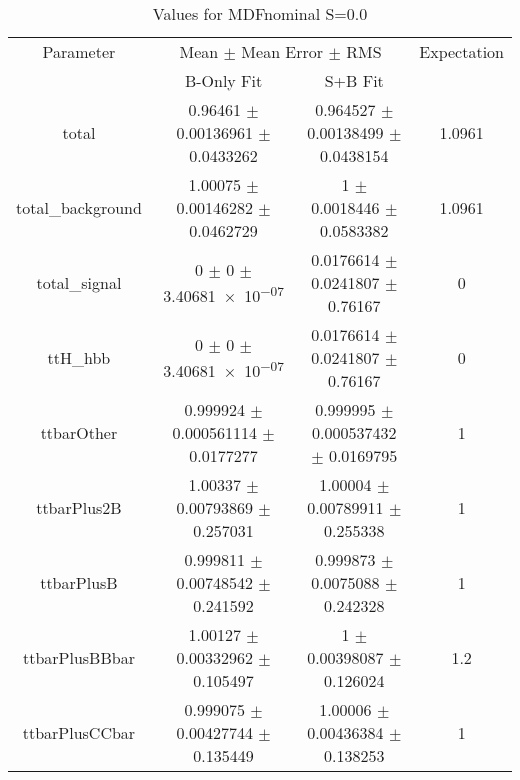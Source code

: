 \begin{table}
\centering
\caption{Values for MDFnominal S=0.0}
\begin{tabular}{cccc}
\toprule
Parameter & \multicolumn{2}{c}{Mean $\pm$ Mean Error $\pm$ RMS} & Expectation\\
 & B-Only Fit & S+B Fit & \\
\midrule
total & \num{0.96461} $\pm$ \num{0.00136961} $\pm$ \num{0.0433262} & \num{0.964527} $\pm$ \num{0.00138499} $\pm$ \num{0.0438154} & \num{1.0961}\\
total\_background & \num{1.00075} $\pm$ \num{0.00146282} $\pm$ \num{0.0462729} & \num{1} $\pm$ \num{0.0018446} $\pm$ \num{0.0583382} & \num{1.0961}\\
total\_signal & \num{0} $\pm$ \num{0} $\pm$ \num{3.40681e-07} & \num{0.0176614} $\pm$ \num{0.0241807} $\pm$ \num{0.76167} & \num{0}\\
ttH\_hbb & \num{0} $\pm$ \num{0} $\pm$ \num{3.40681e-07} & \num{0.0176614} $\pm$ \num{0.0241807} $\pm$ \num{0.76167} & \num{0}\\
ttbarOther & \num{0.999924} $\pm$ \num{0.000561114} $\pm$ \num{0.0177277} & \num{0.999995} $\pm$ \num{0.000537432} $\pm$ \num{0.0169795} & \num{1}\\
ttbarPlus2B & \num{1.00337} $\pm$ \num{0.00793869} $\pm$ \num{0.257031} & \num{1.00004} $\pm$ \num{0.00789911} $\pm$ \num{0.255338} & \num{1}\\
ttbarPlusB & \num{0.999811} $\pm$ \num{0.00748542} $\pm$ \num{0.241592} & \num{0.999873} $\pm$ \num{0.0075088} $\pm$ \num{0.242328} & \num{1}\\
ttbarPlusBBbar & \num{1.00127} $\pm$ \num{0.00332962} $\pm$ \num{0.105497} & \num{1} $\pm$ \num{0.00398087} $\pm$ \num{0.126024} & \num{1.2}\\
ttbarPlusCCbar & \num{0.999075} $\pm$ \num{0.00427744} $\pm$ \num{0.135449} & \num{1.00006} $\pm$ \num{0.00436384} $\pm$ \num{0.138253} & \num{1}\\
\bottomrule
\end{tabular}
\end{table}